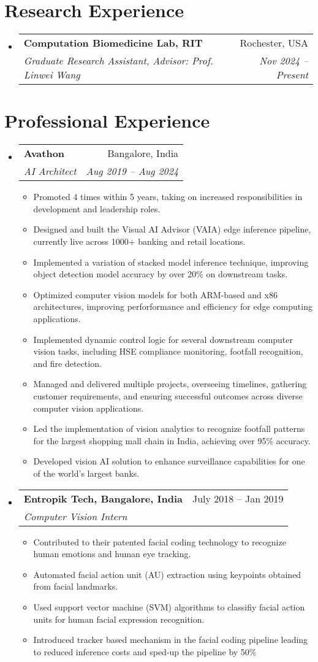 \documentclass[letterpaper,10pt]{article}
\makeatletter
\newcommand{\resumeItem}[1]{
  \item\small{
    {#1 \vspace{-2pt}}
  }
}
\newcommand{\resumeSubheading}[4]{
  \vspace{-2pt}\item
    \begin{tabular*}{0.97\textwidth}[t]{l@{\extracolsep{\fill}}r}
      \textbf{#1} & #2 \\
      \textit{\small#3} & \textit{\small #4} \\
    \end{tabular*}\vspace{-7pt}
}
\newcommand{\resumeSubHeadingListStart}{\begin{itemize}[leftmargin=0.15in, label={}]}
\newcommand{\resumeSubHeadingListEnd}{\end{itemize}}
\newcommand{\resumeItemListStart}{\begin{itemize}}
\newcommand{\resumeItemListEnd}{\end{itemize}\vspace{-5pt}}
\makeatother
\begin{document}
\section{Research Experience}
  \resumeSubHeadingListStart
    \resumeSubheading
        {Computation Biomedicine Lab, RIT}{Rochester, USA}
        {Graduate Research Assistant, Advisor: Prof. Linwei Wang}{Nov 2024 -- Present}  
  \resumeSubHeadingListEnd

\section{Professional Experience}
  \resumeSubHeadingListStart
    \resumeSubheading
      {Avathon}{Bangalore, India}
      {AI Architect}{Aug 2019 -- Aug 2024}
      \resumeItemListStart
        \resumeItem{Promoted 4 times within 5 years, taking on increased responsibilities in development and leadership roles.}
        \resumeItem{Designed and built the Visual AI Advisor (VAIA) edge inference pipeline, currently live across 1000+ banking and retail locations.}
        \resumeItem{Implemented a variation of stacked model inference technique, improving object detection model accuracy by over 20\% on downstream tasks.}
        \resumeItem{Optimized computer vision models for both ARM-based and x86 architectures, improving perforformance and efficiency for edge computing applications.}
        \resumeItem{Implemented dynamic control logic for several downstream computer vision tasks, including HSE compliance monitoring, footfall recognition, and fire detection.}
        \resumeItem{Managed and delivered multiple projects, overseeing timelines, gathering customer requirements, and ensuring successful outcomes across diverse computer vision applications.}
        \resumeItem{Led the implementation of vision analytics to recognize footfall patterns for the largest shopping mall chain in India, achieving over 95\% accuracy.}
        \resumeItem{Developed vision AI solution to enhance surveillance capabilities for one of the world's largest banks.}
      \resumeItemListEnd

      \resumeSubheading
      {Entropik Tech, Bangalore, India}{July 2018 -- Jan 2019} 
      {Computer Vision Intern}{}
      \resumeItemListStart
        \resumeItem{Contributed to their patented facial coding technology to recognize human emotions and human eye tracking.}
        \resumeItem{Automated facial action unit (AU) extraction using keypoints obtained from facial landmarks.}
        \resumeItem{Used support vector machine (SVM) algorithms to classifiy facial action units for human facial expression recognition.}
        \resumeItem{Introduced tracker based mechanism in the facial coding pipeline leading to reduced inference costs and sped-up the pipeline by 50\%}
      \resumeItemListEnd
  \resumeSubHeadingListEnd
\end{document}
